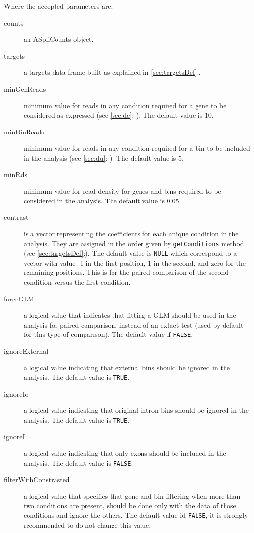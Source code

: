\documentclass{article}
\newcommand{\secref}[1]{\ref{#1}:\nameref{#1}}
\begin{document}
Where the accepted parameters are:
\begin{description}
  \item[counts] an ASpliCounts object.
  \item[targets] a targets data frame built as explained in 
  \secref{sec:targetsDef}.
  \item[minGenReads] minimum value for reads in any condition required for a
  gene to be considered as expressed (see \secref{sec:de} ). The default value
  is 10.
  \item[minBinReads] minimum value for reads in any condition required for a
  bin to be included in the analysis (see \secref{sec:du} ). The default value
  is 5.
  \item[minRds] minimum value for read density for genes and bins required to be
  considered in the analysis. The default value is 0.05.
  \item[contrast] is a vector representing the coefficients for each unique
  condition in the analysis. They are assigned in the order given by
  \texttt{getConditions} method (see \secref{sec:targetsDef}). The default value
  is \texttt{NULL} which correspond to a vector with value -1 in the first
  position, 1 in the second, and zero for the remaining positions. This is for
  the paired comparison of the second condition versus the first condition.
  \item[forceGLM] a logical value that indicates that fitting a GLM should be
  used in the analysis for paired comparison, instead of an extact test (used
  by default for this type of comparison). The default value if \texttt{FALSE}.
  \item[ignoreExternal] a logical value indicating that external bins should
  be ignored in the analysis. The default value is \texttt{TRUE}.
  \item[ignoreIo] a logical value indicating that original intron bins should
  be ignored in the analysis. The default value is \texttt{TRUE}.
  \item[ignoreI] a logical value indicating that only exons should be included
  in the analysis. The default value is \texttt{FALSE}.
  \item[filterWithConstrasted] a logical value that specifies that gene and
  bin filtering when more than two conditions are present, should be done only
  with the data of those conditions and ignore the others. The default value
  id \texttt{FALSE}, it is strongly recommended to do not change this value.
  
\end{description}
\end{document}
